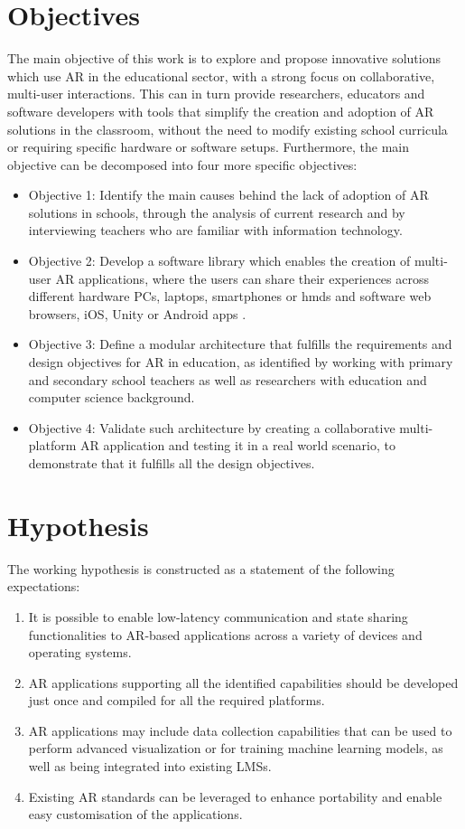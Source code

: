 \section{Objectives}\label{sec:objectives}
The main objective of this work is to explore and propose innovative solutions which use AR in the educational sector, with a strong focus on collaborative, multi-user interactions. This can in turn provide researchers, educators and software developers with tools that simplify the creation and adoption of AR solutions in the classroom, without the need to modify existing school curricula or requiring specific hardware or software setups. Furthermore, the main objective can be decomposed into four more specific objectives:

\begin{itemize}
    \item Objective 1: Identify the main causes behind the lack of adoption of AR solutions in schools, through the analysis of current research and by interviewing teachers who are familiar with information technology.
    \item Objective 2: Develop a software library which enables the creation of multi-user AR applications, where the users can share their experiences across different hardware \textendash{} PCs, laptops, smartphones or \glspl{hmd} \textendash{} and software \textendash{} web browsers, iOS, Unity or Android apps \textendash{}.
    \item Objective 3: Define a modular architecture that fulfills the requirements and design objectives for AR in education, as identified by working with primary and secondary school teachers as well as researchers with education and computer science background.
    \item Objective 4: Validate such architecture by creating a collaborative multi-platform AR application and testing it in a real world scenario, to demonstrate that it fulfills all the design objectives.
\end{itemize}

\section{Hypothesis}\label{sec:hypothesis}
The working hypothesis is constructed as a statement of the following expectations:
\begin{enumerate}
    \item It is possible to enable low-latency communication and state sharing functionalities to AR-based applications across a variety of devices and operating systems.
    \item AR applications supporting all the identified capabilities should be developed just once and compiled for all the required platforms.
    \item AR applications may include data collection capabilities that can be used to perform advanced visualization or for training machine learning models, as well as being integrated into existing LMSs.
    \item Existing AR standards can be leveraged to enhance portability and enable easy customisation of the applications.
\end{enumerate}

